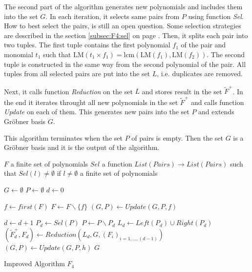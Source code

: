 The second part of the algorithm generates new polynomials and includes them into the set $G$. In each iteration, it selects same pairs from $P$ using function \textit{Sel}. How to best select the pairs, is still an open question. Some selection strategies are described in the section \ref{subsec:F4:sel} on page \pageref{subsec:F4:sel}. Then, it splits each pair into two tuples. The first tuple contains the first polynomial $f_1$ of the pair and monomial $t_1$ such that $\textrm{LM}(t_1 \times f_1) = \textrm{lcm}(\textrm{LM}(f_1),\textrm{LM}(f_2))$. The second tuple is constructed in the same way from the second polynomial of the pair. All tuples from all selected pairs are put into the set $L$, i.e. duplicates are removed.

Next, it calls function \textit{Reduction} on the set $L$ and stores result in the set $\tilde{F}^+$. In the end it iterates throught all new polynomials in the set $\tilde{F}^+$ and calls function \textit{Update} on each of them. This generates new pairs into the set $P$ and extends Gr\"obner basis $G$.

This algorithm terminates when the set $P$ of pairs is empty. Then the set $G$ is a Gr\"obner basis and it is the output of the algorithm.

\begin{algorithm}[ht]
  \begin{algorithmic}[5]
    \Require
      \Statex $F$ a finite set of polynomials
      \Statex $Sel$ a function $List(Pairs) \to List(Pairs)$ such that $Sel(l) \neq \emptyset$ if $l\neq\emptyset$
    \Ensure
      \Statex a finite set of polynomials
      \Statex

    \State $G \gets \emptyset$
    \State $P \gets \emptyset$
    \State $d \gets 0$

      \State $f \gets first(F)$
      \State $F \gets F\backslash \{f\}$
      \State $(G, P) \gets Update(G, P, f)$
    \EndWhile
    
      \State $d \gets d + 1$
      \State $P_d \gets Sel(P)$
      \State $P \gets P\backslash P_d$
      \State $L_d \gets Left(P_d) \cup Right(P_d)$
      \State $(\tilde{F}^+_d, F_d) \gets Reduction(L_d, G, (F_i)_{i=1,\ldots,(d-1)})$
        \State $(G, P) \gets Update(G, P, h)$
      \EndFor
    \EndWhile
    \State \Return $G$

  \end{algorithmic}
  \caption{Improved Algorithm $F_4$}
\end{algorithm}

